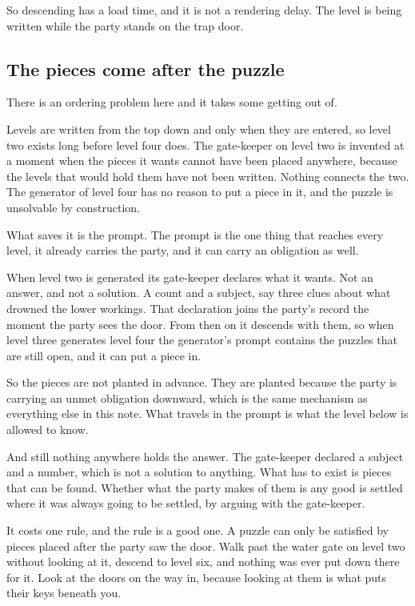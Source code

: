 \documentclass[11pt,a4paper]{article}
\begin{document}
\begin{sectionbox}
So descending has a load time, and it is not a rendering delay. The level is being written while
the party stands on the trap door.
\end{sectionbox}

\subsection{The pieces come after the puzzle}
\label{sec:pieces}

There is an ordering problem here and it takes some getting out of.

Levels are written from the top down and only when they are entered, so level two exists long
before level four does. The gate-keeper on level two is invented at a moment when the pieces it wants
cannot have been placed anywhere, because the levels that would hold them have not been written.
Nothing connects the two. The generator of level four has no reason to put a piece in it, and the
puzzle is unsolvable by construction.

What saves it is the prompt. The prompt is the one thing that reaches every level, it already
carries the party, and it can carry an obligation as well.

When level two is generated its gate-keeper declares what it wants. Not an answer, and not a
solution. A count and a subject, say three clues about what drowned the lower workings. That
declaration joins the party's record the moment the party sees the door. From then on it
descends with them, so when level three generates level four the generator's prompt contains the
puzzles that are still open, and it can put a piece in.

So the pieces are not planted in advance. They are planted because the party is carrying an
unmet obligation downward, which is the same mechanism as everything else in this note. What
travels in the prompt is what the level below is allowed to know.

\begin{sectionbox}
And still nothing anywhere holds the answer. The gate-keeper declared a subject and a number, which
is not a solution to anything. What has to exist is pieces that can be found. Whether what the
party makes of them is any good is settled where it was always going to be settled, by arguing
with the gate-keeper.
\end{sectionbox}

It costs one rule, and the rule is a good one. A puzzle can only be satisfied by pieces placed
after the party saw the door. Walk past the water gate on level two without looking at it,
descend to level six, and nothing was ever put down there for it. Look at the doors on the way
in, because looking at them is what puts their keys beneath you.
\end{document}
